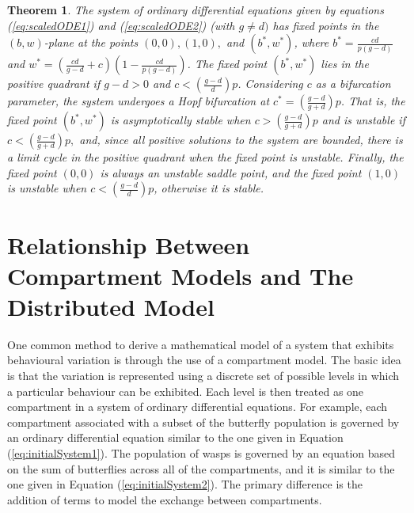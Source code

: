 \documentclass[review,authoryear]{elsarticle}
\newtheorem{theorem}{Theorem}[section]
\begin{document}
\begin{theorem}
  The system of ordinary differential equations given by equations (\ref{eq:scaledODE1}) and (\ref{eq:scaledODE2}) (with $g\ne d)$ has fixed points in the $(b,w)$-plane at the points $(0,0), (1,0),$ and $(b^*,w^*)$, where $b^*=\frac{cd}{p(g-d)}$ and
$w^*=\left(\frac{cd}{g-d}+c\right)\left(1-\frac{cd}{p(g-d)}\right)$. 
 The  fixed point $(b^*,w^*)$ lies in the positive quadrant if $g-d>0$ and $c<\left( \frac{g-d}{d}\right)p$.  Considering $c$ as a bifurcation parameter, the system undergoes a Hopf bifurcation at $c^* = \left( \frac{g-d}{g+d}\right)p$.  
That is, the fixed point $(b^*,w^*)$ is asymptotically stable when $c>\left( \frac{g-d}{g+d}\right)p$ and is unstable if $c<\left( \frac{g-d}{g+d}\right)p,$ and, since all positive solutions to the system are bounded,  there is   a  limit cycle in the positive quadrant when the fixed point is unstable.
Finally, the fixed point $(0,0)$ is always an unstable saddle point, and the fixed point $(1,0)$ is unstable when $c<\left( \frac{g-d}{d}\right)p$, otherwise it is stable.
\end{theorem}

\label{appendix:stability}




\section{Relationship Between Compartment Models and The Distributed Model}
\label{appendix:compartmentModels}

One common method to derive a mathematical model of a system that exhibits behavioural variation is through the use of a compartment model.  
The basic idea is that the variation is represented using a discrete set of possible levels in which a particular behaviour can be exhibited.
Each level is then treated as one compartment in a system of ordinary differential equations. 
For example, each compartment associated with a subset of the butterfly population is governed by an ordinary differential equation similar to the one given in Equation (\ref{eq:initialSystem1}). 
The population of wasps is governed by an equation based on the sum of butterflies across all of the compartments, and it is similar to the one given in Equation (\ref{eq:initialSystem2}). The primary difference is the addition of terms to model the exchange between compartments.
\end{document}
